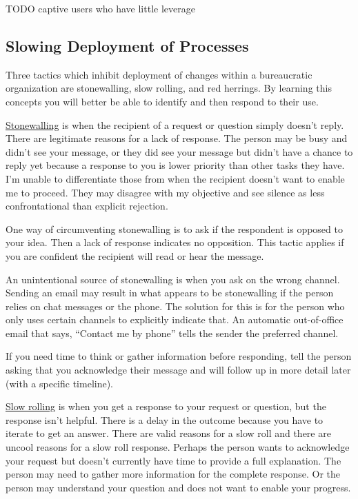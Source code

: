 TODO
captive users who have little leverage 


\subsection*{Slowing Deployment of Processes\label{sec:slow-deployment}}

Three tactics which inhibit deployment of changes within a bureaucratic organization are stonewalling, slow rolling, and red herrings. By learning this concepts you will better be able to identify and then respond to their use.

\underline{Stonewalling} is when the recipient of a request or question simply doesn't reply. There are legitimate reasons for a lack of response. The person may be busy and didn't see your message, or they did see your message but didn't have a chance to reply yet because a response to you is lower priority than other tasks they have. I'm unable to differentiate those from when the recipient doesn't want to enable me to proceed. They may disagree with my objective and see silence as less confrontational than explicit rejection. 

One way of circumventing stonewalling is to ask if the respondent is opposed to your idea. 
Then a lack of response indicates no opposition. This tactic applies if you are confident the recipient will read or hear the message.

An unintentional source of stonewalling is when you ask on the wrong channel. Sending an email may result in what appears to be stonewalling if the person relies on chat messages or the phone. The solution for this 
is for the person who only uses certain channels to explicitly indicate that. An automatic out-of-office email that says, ``Contact me by phone'' tells the sender the preferred channel.

If you need time to think or gather information before responding, 
tell the person asking that you acknowledge their message and will follow up in more detail later (with a specific timeline). 

\underline{Slow rolling} is when you get a response to your request or question, but the response isn't helpful. There is a delay in the outcome because you have to iterate to get an answer. There are valid reasons for a slow roll and there are uncool reasons for a slow roll response. Perhaps the person wants to acknowledge your request but doesn't currently have time to provide a full explanation. The person may need to gather more information for the complete response. Or the person may understand your question and does not want to enable your progress. 

